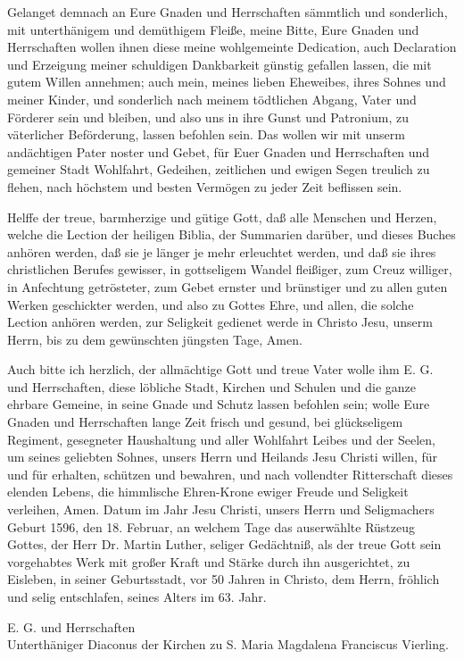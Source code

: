 Gelanget demnach an Eure Gnaden und Herrschaften sämmtlich und sonderlich, mit unterthänigem und demüthigem Fleiße, meine Bitte, Eure Gnaden und Herrschaften wollen ihnen diese meine wohlgemeinte Dedication, auch Declaration und Erzeigung meiner schuldigen Dankbarkeit günstig gefallen lassen, die mit gutem Willen annehmen; auch mein, meines lieben Eheweibes, ihres Sohnes und meiner Kinder, und sonderlich nach meinem tödtlichen Abgang, Vater und Förderer sein und bleiben, und also uns in ihre Gunst und Patronium, zu väterlicher Beförderung, lassen befohlen sein. Das wollen wir mit unserm andächtigen Pater noster und Gebet, für Euer Gnaden und Herrschaften und gemeiner Stadt Wohlfahrt, Gedeihen, zeitlichen und ewigen Segen treulich zu flehen, nach höchstem und besten Vermögen zu jeder Zeit beflissen sein.

Helffe der treue, barmherzige und gütige Gott, daß alle Menschen und Herzen, welche die Lection der heiligen Biblia, der Summarien darüber, und dieses Buches anhören werden, daß sie je länger je mehr erleuchtet werden, und daß sie ihres christlichen Berufes gewisser, in gottseligem Wandel fleißiger, zum Creuz williger, in Anfechtung getrösteter, zum Gebet ernster und brünstiger und zu allen guten Werken geschickter werden, und also zu Gottes Ehre, und allen, die solche Lection anhören werden, zur Seligkeit gedienet werde in Christo Jesu, unserm Herrn, bis zu dem gewünschten jüngsten Tage, Amen.

Auch bitte ich herzlich, der allmächtige Gott und treue Vater wolle ihm E. G. und Herrschaften, diese löbliche Stadt, Kirchen und Schulen und die ganze ehrbare Gemeine, in seine Gnade und Schutz lassen befohlen sein; wolle Eure Gnaden und Herrschaften lange Zeit frisch und gesund, bei glückseligem Regiment, gesegneter Haushaltung und aller Wohlfahrt Leibes und der Seelen, um seines geliebten Sohnes, unsers Herrn und Heilands Jesu Christi willen, für und für erhalten, schützen und bewahren, und nach vollendter Ritterschaft dieses elenden Lebens, die himmlische Ehren-Krone ewiger Freude und Seligkeit verleihen, Amen. Datum im Jahr Jesu Christi, unsers Herrn und Seligmachers Geburt 1596, den 18. Februar, an welchem Tage das auserwählte Rüstzeug Gottes, der Herr Dr. Martin Luther, seliger Gedächtniß, als der treue Gott sein vorgehabtes Werk mit großer Kraft und Stärke durch ihn ausgerichtet, zu Eisleben, in seiner Geburtsstadt, vor 50 Jahren in Christo, dem Herrn, fröhlich und selig entschlafen, seines Alters im 63. Jahr.

\begin{unterschrift}

E. G. und Herrschaften\\Unterthäniger Diaconus der Kirchen zu S. Maria Magdalena Franciscus Vierling.

\end{unterschrift}
